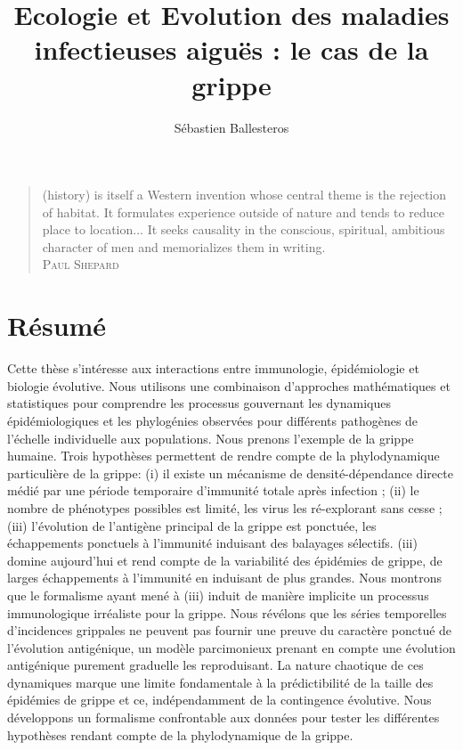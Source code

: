 \documentclass[12pt]{report}
\title{Ecologie et Evolution des maladies infectieuses aiguës : le cas
  de la grippe}
\author{Sébastien Ballesteros}
\date{}
\begin{document}

\newpage
\thispagestyle{empty}
\null
\newpage

\maketitle



\begin{quote}
  (history) is itself a Western invention whose central theme is the
  rejection of habitat. It formulates experience outside of nature and
  tends to reduce place to location... It seeks causality in the
  conscious, spiritual, ambitious character of men and memorializes
  them in writing.\\
  \textsc{Paul Shepard}
\end{quote}

\cleardoublepage

\section*{Résumé}

Cette thèse s'intéresse aux interactions entre immunologie,
épidémiologie et biologie évolutive. Nous utilisons une combinaison
d'approches mathématiques et statistiques pour comprendre les
processus gouvernant les dynamiques épidémiologiques et les
phylogénies observées pour différents pathogènes de l'échelle
individuelle aux populations. Nous prenons l'exemple de la grippe
humaine. Trois hypothèses permettent de rendre compte de la
phylodynamique particulière de la grippe: (i) il existe un mécanisme
de densité-dépendance directe médié par une période temporaire
d'immunité totale après infection ; (ii) le nombre de phénotypes
possibles est limité, les virus les ré-explorant sans cesse ; (iii)
l'évolution de l'antigène principal de la grippe est ponctuée, les
échappements ponctuels à l'immunité induisant des balayages
sélectifs. (iii) domine aujourd'hui et rend compte de la variabilité
des épidémies de grippe, de larges échappements à l'immunité en
induisant de plus grandes. Nous montrons que le formalisme ayant mené
à (iii) induit de manière implicite un processus immunologique
irréaliste pour la grippe. Nous révélons que les séries temporelles
d'incidences grippales ne peuvent pas fournir une preuve du caractère
ponctué de l'évolution antigénique, un modèle parcimonieux prenant en
compte une évolution antigénique purement graduelle les
reproduisant. La nature chaotique de ces dynamiques marque une limite
fondamentale à la prédictibilité de la taille des épidémies de grippe
et ce, indépendamment de la contingence évolutive. Nous développons un
formalisme confrontable aux données pour tester les différentes
hypothèses rendant compte de la phylodynamique de la grippe.
\end{document}
